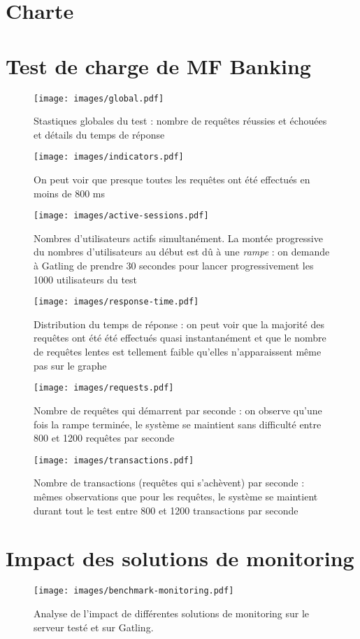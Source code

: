 \appendix

\chapter{Charte \excilys{}}
\label{ann:charte}


\chapter{Test de charge de MF Banking}
\label{ann:gatling}
\begin{figure}[h!]
	\centering
		\texttt{[image: images/global.pdf]}
	\caption{Stastiques globales du test : nombre de requêtes réussies et échouées et détails du temps de réponse}
\end{figure}

\begin{figure}[h!]
	\centering
		\texttt{[image: images/indicators.pdf]}
	\caption{On peut voir que presque toutes les requêtes ont été effectués en moins de 800 ms}
\end{figure}

\begin{figure}[h!]
	\centering
		\texttt{[image: images/active-sessions.pdf]}
	\caption{Nombres d'utilisateurs actifs simultanément. La montée progressive du nombres d'utilisateurs au début est dû à une \textit{rampe} : on demande à Gatling de prendre 30 secondes pour lancer progressivement les 1000 utilisateurs du test}
\end{figure}

\begin{figure}[h!]
	\centering
		\texttt{[image: images/response-time.pdf]}
	\caption{Distribution du temps de réponse : on peut voir que la majorité des requêtes ont été été effectués quasi instantanément et que le nombre de requêtes lentes est tellement faible qu'elles n'apparaissent même pas sur le graphe}
\end{figure}

\begin{figure}[h!]
	\centering
		\texttt{[image: images/requests.pdf]}
	\caption{Nombre de requêtes qui démarrent par seconde : on observe qu'une fois la rampe terminée, le système se maintient sans difficulté entre 800 et 1200 requêtes par seconde}
\end{figure}

\begin{figure}[h!]
	\centering
		\texttt{[image: images/transactions.pdf]}
	\caption{Nombre de transactions (requêtes qui s'achèvent) par seconde : mêmes observations que pour les requêtes, le système se maintient durant tout le test entre 800 et 1200 transactions par seconde}
\end{figure}

\chapter{Impact des solutions de monitoring}
\label{ann:benchmark}
\begin{figure}[h!]
	\centering
		\texttt{[image: images/benchmark-monitoring.pdf]}
	\caption{Analyse de l'impact de différentes solutions de monitoring sur le serveur testé et sur Gatling.}
\end{figure}